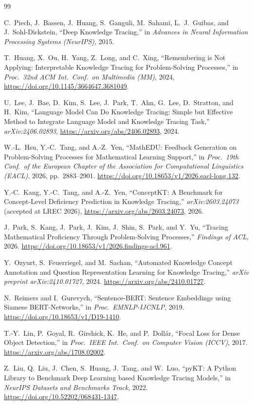 \begin{thebibliography}{99}
\setlength{\itemsep}{2pt}

C.~Piech, J.~Bassen, J.~Huang, S.~Ganguli, M.~Sahami, L.~J.~Guibas, and
J.~Sohl-Dickstein, ``Deep Knowledge Tracing,'' in \emph{Advances in Neural
Information Processing Systems (NeurIPS)}, 2015.

T.~Huang, X.~Ou, H.~Yang, Z.~Long, and C.~Xing, ``Remembering is Not Applying:
Interpretable Knowledge Tracing for Problem-Solving Processes,'' in \emph{Proc.\ 32nd
ACM Int.\ Conf.\ on Multimedia (MM)}, 2024, \url{https://doi.org/10.1145/3664647.3681049}.

U.~Lee, J.~Bae, D.~Kim, S.~Lee, J.~Park, T.~Ahn, G.~Lee, D.~Stratton, and H.~Kim,
``Language Model Can Do Knowledge Tracing: Simple but Effective Method to Integrate
Language Model and Knowledge Tracing Task,'' \emph{arXiv:2406.02893}, \url{https://arxiv.org/abs/2406.02893},
2024.

W.-L.~Hsu, Y.-C.~Tang, and A.-Z.~Yen, ``MathEDU: Feedback Generation on
Problem-Solving Processes for Mathematical Learning Support,'' in \emph{Proc.\ 19th
Conf.\ of the European Chapter of the Association for Computational Linguistics
(EACL)}, 2026, pp.~2883--2901. \url{https://doi.org/10.18653/v1/2026.eacl-long.132}.

Y.-C.~Kang, Y.-C.~Tang, and A.-Z.~Yen, ``ConceptKT: A Benchmark for Concept-Level
Deficiency Prediction in Knowledge Tracing,'' \emph{arXiv:2603.24073} (accepted at LREC 2026), \url{https://arxiv.org/abs/2603.24073},
2026.

J.~Park, S.~Kang, J.~Park, J.~Kim, J.~Shin, S.~Park, and Y.~Yu, ``Tracing
Mathematical Proficiency Through Problem-Solving Processes,'' \emph{Findings of ACL}, 2026. \url{https://doi.org/10.18653/v1/2026.findings-acl.961}.

Y.~Ozyurt, S.~Feuerriegel, and M.~Sachan, ``Automated Knowledge Concept Annotation
and Question Representation Learning for Knowledge Tracing,'' \emph{arXiv preprint
arXiv:2410.01727}, 2024. \url{https://arxiv.org/abs/2410.01727}.

N.~Reimers and I.~Gurevych, ``Sentence-BERT: Sentence Embeddings using Siamese
BERT-Networks,'' in \emph{Proc.\ EMNLP-IJCNLP}, 2019. \url{https://doi.org/10.18653/v1/D19-1410}.

T.-Y.~Lin, P.~Goyal, R.~Girshick, K.~He, and P.~Doll\'ar, ``Focal Loss for Dense
Object Detection,'' in \emph{Proc.\ IEEE Int.\ Conf.\ on Computer Vision (ICCV)},
2017. \url{https://arxiv.org/abs/1708.02002}.

Z.~Liu, Q.~Liu, J.~Chen, S.~Huang, J.~Tang, and W.~Luo, ``pyKT: A Python
Library to Benchmark Deep Learning based Knowledge Tracing Models,'' in \emph{NeurIPS
Datasets and Benchmarks Track}, 2022. \url{https://doi.org/10.52202/068431-1347}.

\end{thebibliography}